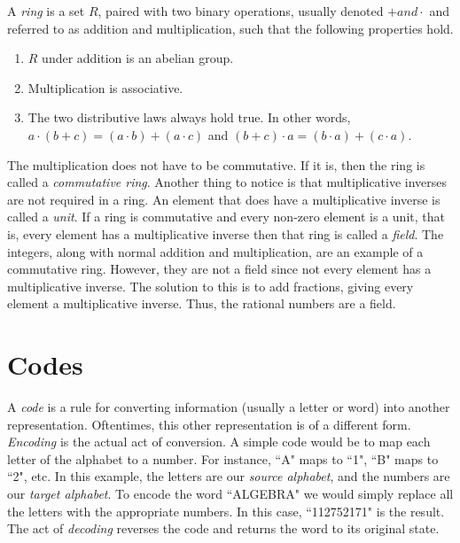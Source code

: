 \documentclass{article}
\begin{document}
A \textit{ring} is a set $R$, paired with two binary operations, usually denoted $+ and \cdot$ and referred to as addition and multiplication, such that the following properties hold.
\begin{enumerate}
  \item $R$ under addition is an abelian group.
  \item Multiplication is associative.
  \item The two distributive laws always hold true. In other words, $a \cdot (b + c) = (a \cdot b) + (a \cdot c)$ and $(b + c) \cdot a = (b \cdot a) + (c \cdot a)$.
\end{enumerate}
The multiplication does not have to be commutative. If it is, then the ring is called a \textit{commutative ring}. Another thing to notice is that multiplicative inverses are not required in a ring. An element that does have a multiplicative inverse is called a \textit{unit}. If a ring is commutative and every non-zero element is a unit, that is, every element has a multiplicative inverse then that ring is called a \textit{field}. The integers, along with normal addition and multiplication, are an example of a commutative ring. However, they are not a field since not every element has a multiplicative inverse. The solution to this is to add fractions, giving every element a multiplicative inverse. Thus, the rational numbers are a field.


\section{Codes}
A \textit{code} is a rule for converting information (usually a letter or word) into another representation. Oftentimes, this other representation is of a different form. \textit{Encoding} is the actual act of conversion. A simple code would be to map each letter of the alphabet to a number. For instance, ``A" maps to ``1", ``B" maps to ``2", etc. In this example, the letters are our \textit{source alphabet}, and the numbers are our \textit{target alphabet}. To encode the word ``ALGEBRA" we would simply replace all the letters with the appropriate numbers. In this case, ``112752171" is the result. The act of \textit{decoding} reverses the code and returns the word to its original state.
\end{document}
